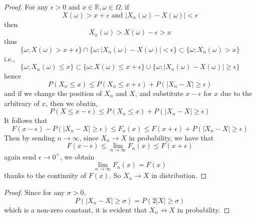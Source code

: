 \documentclass{homework}
\begin{document}
\begin{subproblem}
        \item
        \begin{proof}
            For any $\epsilon>0$ and $x\in\mathbb R,\omega\in\Omega$,
            if
            \[X(\omega)>x+\epsilon\text{ and }
            |X_n(\omega)-X(\omega)|<\epsilon\]
            then
            \[X_n(\omega)>X(\omega)-\epsilon>x\]
            thus
            \[\{\omega;X(\omega)>x+\epsilon\}\cap
            \{\omega;|X_n(\omega)-X(\omega)|<\epsilon\}
            \subset \{\omega;X_n(\omega)>x\}\]
            i.e.,
            \[\{\omega;X_n(\omega)\leq x\}
            \subset\{\omega;X(\omega)\leq x+\epsilon\}
            \cup\{\omega;|X_n(\omega)-X(\omega)|\geq\epsilon\}\]
            hence
            \[P(X_n\leq x)\leq P(X_n\leq x+\epsilon)+P(|X_n-X|\geq\epsilon)\]
            and if we change the position of $X_n$ and $X$, and substitute
            $x-\epsilon$ for $x$ due to the arbitrary of $x$, then we obatin,
            \[P(X\leq x-\epsilon)\leq P(X_n\leq x)+P(|X_n-X|\geq\epsilon)\]
            It follows that
            \[F(x-\epsilon)-P(|X_n-X|\geq\epsilon)
            \leq F_n(x)\leq
            F(x+\epsilon)+P(|X_n-X|\geq\epsilon)\]
            Then by sending $n\to\infty$, since $X_n\to X$ in probability,
            we have that
            \[F(x-\epsilon)\leq\lim_{n\to\infty}F_n(x)\leq F(x+\epsilon)\]
            again send $\epsilon\to 0^+$, we obtain
            \[\lim_{n\to\infty}F_n(x)=F(x)\]
            thanks to the continuity of $F(x)$. So $X_n\to X$ in distribution.
        \end{proof}

        \item
        \begin{proof}
            Since for any $\sigma>0$,
            \[P(|X_n-X|\geq\sigma)=P(2|X|\geq\sigma)\]
            which is a non-zero constant, it is evident that
            $X_n\not\to X$ in probability.
        \end{proof}
    \end{subproblem}
\end{document}
